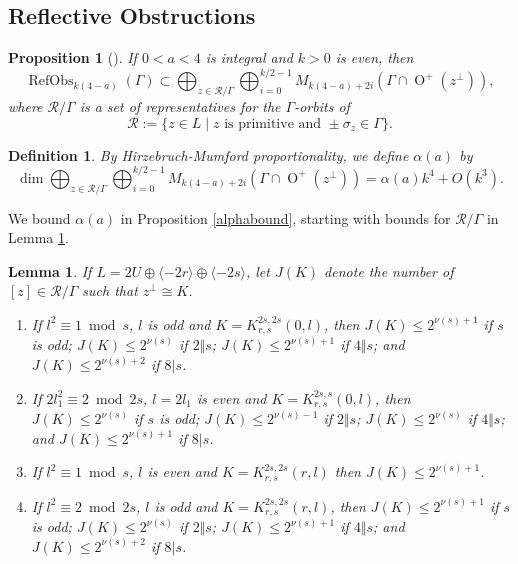 \documentclass[12pt, a4paper]{article}
\newtheorem{lemma}[thm]{Lemma}
\newtheorem{proposition}[thm]{Proposition}
\newtheorem{definition}[thm]{Definition}
\newcommand{\la}{\langle}
\newcommand{\ra}{\rangle}
\newcommand{\rc}{\mathcal{R}}
\newcommand{\opn}{\operatorname}
\newcommand{\op}{\oplus}
\begin{document}
\subsection{Reflective Obstructions}\label{RefObsSec}
\begin{proposition}[{\cite[Proposition 4.1]{HMvol}}]\label{refobsprop}
  If $0<a<4$ is integral and $k>0$ is even, then
\[
  \opn{RefObs}_{k(4-a)}(\Gamma) \subset \bigoplus_{z \in \rc / \Gamma} \bigoplus_{i=0}^{k/2-1} M_{k(4-a) + 2i}(\Gamma \cap \opn{O}^+(z^{\perp})),
\]
where $\rc/ \Gamma$ is a set of representatives for the $\Gamma$-orbits of
  \[
  \rc := \{ z \in L \mid \text{$z$ is primitive and } \pm \sigma_z \in \Gamma \}.
  \]
\end{proposition}
  \begin{definition}
By Hirzebruch-Mumford proportionality, we define $\alpha(a)$ by
\begin{equation}\label{alphadef}
  \opn{dim} \bigoplus_{z \in \rc / \Gamma} \bigoplus_{i=0}^{k/2-1} M_{k(4-a) + 2i}(\Gamma \cap \opn{O}^+(z^{\perp})) = \alpha(a) k^4 + O(k^3).
\end{equation}
\end{definition}
  We bound $\alpha(a)$ in Proposition \ref{alphabound}, starting with bounds for $\rc/\Gamma$ in Lemma \ref{JjLemma}. 
\begin{lemma}\label{JjLemma}
  If $L=2U \op \la -2r \ra \op \la -2s \ra$, let $J(K)$ denote the number of $[z] \in \rc/\Gamma$ such that $z^{\perp} \cong K$.
\begin{enumerate}
  \item If $l^2 \equiv 1 \bmod{ s}$, $l$ is odd and $K=K^{2s, 2s}_{r,s}(0, l)$, then
    $J(K) \leq 2^{\nu(s)+1}$ if $s$ is odd;
    $J(K) \leq 2^{\nu(s)}$ if $2 \Vert s$;
    $J(K) \leq 2^{\nu(s)+1}$ if $4 \Vert s$; and
    $J(K) \leq 2^{\nu(s) + 2}$  if $8 \vert s$.  
  \item If $2 l_1^2 \equiv 2 \bmod{ 2s}$, $l=2l_1$ is even and $K= K^{2s,s}_{r,s}(0,l)$, then
    $J(K) \leq 2^{\nu(s)}$ if $s$ is odd;
    $J(K) \leq 2^{\nu(s)-1}$ if $2 \Vert s$;
    $J(K) \leq 2^{\nu(s)}$ if $4 \Vert s$; and 
    $J(K) \leq 2^{\nu(s) + 1}$ if $8 \vert s$.
  \item If $l^2 \equiv 1 \bmod{ s}$, $l$ is even and $K= K^{2s, 2s}_{r,s}(r,l)$ then $J(K) \leq 2^{\nu(s)+1}$.
  \item If $l^2 \equiv 2 \bmod{ 2s}$, $l$ is odd and $K=K^{2s,2s}_{r,s}(r,l)$, then
    $J(K) \leq 2^{\nu(s)+1}$ if $s$ is odd;
    $J(K) \leq 2^{\nu(s)}$ if $2 \Vert s$;
    $J(K) \leq 2^{\nu(s)+1}$ if $4 \Vert s$; and
    $J(K) \leq 2^{\nu(s) + 2}$  if $8 \vert s$.  
  \end{enumerate}
\end{lemma}
\end{document}

